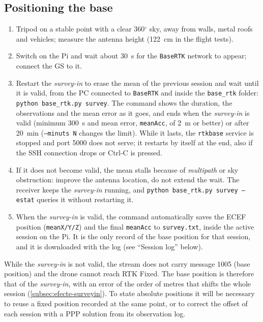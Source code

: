 \subsection{Positioning the base}
\begin{enumerate}[label=\alph*)]
    \item Tripod on a stable point with a clear 360$^{\circ}$ sky, away from walls, metal roofs and vehicles; measure the antenna height (122~cm in the flight tests).
    \item Switch on the Pi and wait about 30~s for the \texttt{BaseRTK} network to appear; connect the GS to it.
    \item Restart the \emph{survey-in} to erase the mean of the previous session and wait until it is valid, from the PC connected to \texttt{BaseRTK} and inside the \texttt{base\_rtk} folder: \texttt{python base\_rtk.py survey}. The command shows the duration, the observations and the mean error as it goes, and ends when the \emph{survey-in} is valid (minimum 300~s and mean error, \texttt{meanAcc}, of 2~m or better) or after 20~min (\texttt{--minuts N} changes the limit). While it lasts, the \texttt{rtkbase} service is stopped and port 5000 does not serve; it restarts by itself at the end, also if the SSH connection drops or Ctrl-C is pressed.
    \item If it does not become valid, the mean stalls because of \emph{multipath} or sky obstruction: improve the antenna location, do not extend the wait. The receiver keeps the \emph{survey-in} running, and \texttt{python base\_rtk.py survey --estat} queries it without restarting it.
    \item When the \emph{survey-in} is valid, the command automatically saves the ECEF position (\texttt{meanX/Y/Z}) and the final \texttt{meanAcc} to \texttt{survey.txt}, inside the active session on the Pi. It is the only record of the base position for that session, and it is downloaded with the log (see ``Session log'' below).
\end{enumerate}

While the \emph{survey-in} is not valid, the stream does not carry message 1005 (base position) and the drone cannot reach RTK Fixed. The base position is therefore that of the \emph{survey-in}, with an error of the order of metres that shifts the whole session (\cref{subsec:efecte-surveyin}). To state absolute positions it will be necessary to reuse a fixed position recorded at the same point, or to correct the offset of each session with a PPP solution from its observation log.

